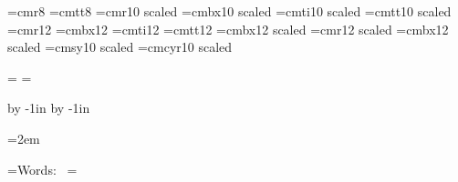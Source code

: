








\font\small=cmr8
\font\smalltt=cmtt8
\font\medium=cmr10 scaled \magstephalf
\font\mediumbx=cmbx10 scaled \magstephalf
\font\mediumit=cmti10 scaled \magstephalf
\font\mediumtt=cmtt10 scaled \magstephalf
\font\large=cmr12
\font\largebx=cmbx12
\font\largeit=cmti12
\font\largett=cmtt12
\font\Largebx=cmbx12 scaled \magstephalf
\font\huge=cmr12 scaled 
\font\hugebx=cmbx12 scaled 
\font\mediumsy=cmsy10 scaled \magstephalf
\font\mediumcy=cmcyr10 scaled \magstephalf

\headline={}
\footline={}

\hsize=210mm
\vsize=297mm

\advance\voffset by -1in
\advance\hoffset by -1in

\newskip\titleskip
\titleskip=8pt

\newskip\posttitleskip
\posttitleskip=0pt

\newskip\basichskip
\basichskip=2em

\newskip\copyrightskip
\copyrightskip=6pt

\newskip\composerskip
\composerskip=4pt

\newdimen\wmdimen
{}=\hbox{{\large Words:  }}
\wmdimen=


